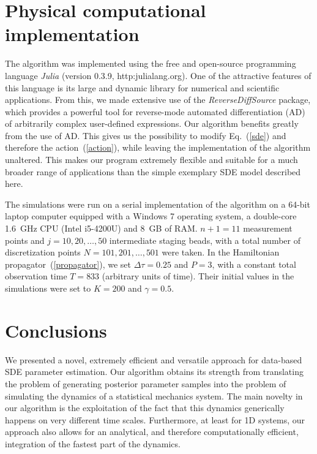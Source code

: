 \documentclass[11pt]{article}
\theoremstyle{definition}
\begin{document}
\section{Physical computational implementation}

The algorithm was implemented using the free and open-source programming language \emph{Julia} (version 0.3.9, http:\/\/julialang.org\/). One of the attractive features of this language is its large and dynamic library for numerical and scientific applications.
From this, we made extensive use of the \emph{ReverseDiffSource} package, which provides a powerful tool for reverse-mode automated differentiation (AD) of arbitrarily complex user-defined expressions. Our algorithm benefits greatly from the use of AD. This gives us the possibility to modify Eq.~(\ref{sde}) and therefore the action~(\ref{action}), while leaving the implementation of the algorithm unaltered. This makes our program extremely flexible and suitable for a much broader range of applications than the simple exemplary SDE model described here.
%

The simulations were run on a serial implementation of the algorithm on a 64-bit laptop computer equipped with a Windows 7 operating system, a double-core 1.6~GHz CPU (Intel i5-4200U) and 8~GB of RAM.  $n+1 = 11$ measurement points and $j = 10, 20,\dots, 50$ intermediate staging beads, with a total number of discretization points $N = 101, 201, \dots, 501$ were taken. In the Hamiltonian propagator~(\ref{propagator}), we set $\Delta\tau = 0.25$ and $P = 3$, with a constant total observation time $T = 833$ (arbitrary units of time).  Their initial values in the simulations were set to $K=200$ and $\gamma = 0.5$.
%



\section{Conclusions}

We presented a novel, extremely efficient and versatile approach for data-based SDE parameter estimation.
Our algorithm obtains its strength from translating the problem of generating posterior parameter samples into the problem of simulating the dynamics of a statistical mechanics system.
The main novelty in our algorithm is the exploitation of the fact that this dynamics generically happens on very different time scales.
Furthermore, at least for 1D systems, our approach also allows for an analytical, and therefore computationally efficient, integration of the fastest part of the dynamics.
\end{document}
